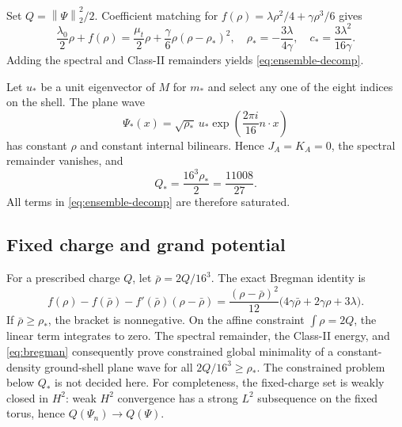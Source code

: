\documentclass[11pt]{article}
\numberwithin{equation}{section}
\theoremstyle{definition}
\newcommand{\norm}[1]{\left\lVert#1\right\rVert}
\begin{document}
Set $Q=\norm{\Psi}_2^2/2$.  Coefficient matching for
$f(\rho)=\lambda\rho^2/4+\gamma\rho^3/6$ gives
\begin{equation}
 \frac{\lambda_0}{2}\rho+f(\rho)
 =\frac{\mu_t}{2}\rho+\frac{\gamma}{6}\rho(\rho-\rho_*)^2,
 \quad \rho_*=-\frac{3\lambda}{4\gamma},
 \quad c_* =\frac{3\lambda^2}{16\gamma}.
 \label{eq:polynomial-completion}
\end{equation}
Adding the spectral and Class-II remainders yields \eqref{eq:ensemble-decomp}.

Let $u_*$ be a unit eigenvector of $M$ for $m_*$ and select any one of the
eight indices on the shell.  The plane wave
\begin{equation}
 \Psi_*(x)=\sqrt{\rho_*}\,u_*\exp\!\left(\frac{2\pi i}{16}n\cdot x\right)
 \label{eq:plane-wave}
\end{equation}
has constant $\rho$ and constant internal bilinears.  Hence $J_A=K_A=0$,
the spectral remainder vanishes, and
\begin{equation}
 Q_*=\frac{16^3\rho_*}{2}=\frac{11008}{27}.
 \label{eq:Qstar-again}
\end{equation}
All terms in \eqref{eq:ensemble-decomp} are therefore saturated.

\subsection{Fixed charge and grand potential}

For a prescribed charge $Q$, let $\bar\rho=2Q/16^3$.  The exact Bregman
identity is
\begin{equation}
 f(\rho)-f(\bar\rho)-f'(\bar\rho)(\rho-\bar\rho)
 =\frac{(\rho-\bar\rho)^2}{12}
   \bigl(4\gamma\bar\rho+2\gamma\rho+3\lambda\bigr).
 \label{eq:bregman}
\end{equation}
If $\bar\rho\ge\rho_*$, the bracket is nonnegative.  On the affine constraint
$\int\rho=2Q$, the linear term integrates to zero.  The spectral remainder,
the Class-II energy, and \eqref{eq:bregman} consequently prove constrained
global minimality of a constant-density ground-shell plane wave for all
$2Q/16^3\ge\rho_*$.  The constrained problem below $Q_*$ is not decided here.  For completeness,
the fixed-charge set is weakly closed in $H^2$: weak $H^2$ convergence has a
strong $L^2$ subsequence on the fixed torus, hence $Q(\Psi_n)\to Q(\Psi)$.
\end{document}
